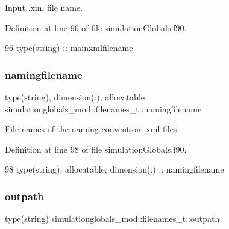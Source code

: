 Input .xml file name. 



Definition at line 96 of file simulation\+Globals.\+f90.


\begin{DoxyCode}
96         \textcolor{keywordtype}{type}(string) :: mainxmlfilename
\end{DoxyCode}
\mbox{\label{structsimulationglobals__mod_1_1filenames__t_ab9bfe3490032ac0fe0ff585f4ccf81ba}} 
\subsubsection{\texorpdfstring{namingfilename}{namingfilename}}
{\footnotesize\ttfamily type(string), dimension(\+:), allocatable simulationglobals\+\_\+mod\+::filenames\+\_\+t\+::namingfilename\hspace{0.3cm}{\ttfamily [private]}}



File names of the naming convention .xml files. 



Definition at line 98 of file simulation\+Globals.\+f90.


\begin{DoxyCode}
98         \textcolor{keywordtype}{type}(string), \textcolor{keywordtype}{allocatable}, \textcolor{keywordtype}{dimension(:)} :: namingfilename
\end{DoxyCode}
\mbox{\label{structsimulationglobals__mod_1_1filenames__t_aa8af9fb10dcd5d2f5dfc0fe299a16755}} 
\subsubsection{\texorpdfstring{outpath}{outpath}}
{\footnotesize\ttfamily type(string) simulationglobals\+\_\+mod\+::filenames\+\_\+t\+::outpath\hspace{0.3cm}{\ttfamily [private]}}




